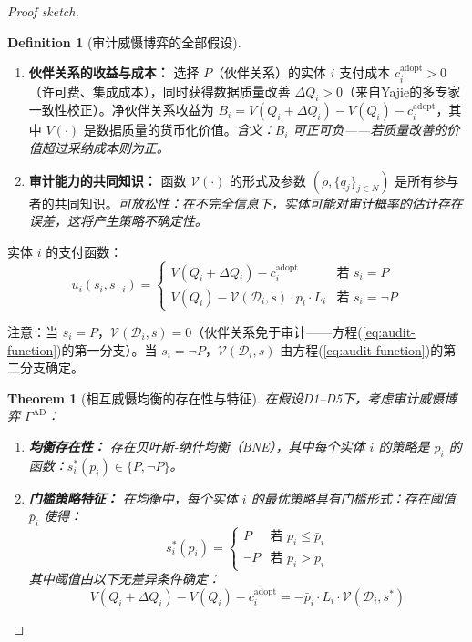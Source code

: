 \documentclass[12pt,a4paper]{ctexart}
\newtheorem{theorem}{Theorem}[section]
\theoremstyle{definition}
\newtheorem{definition}{Definition}[section]
\theoremstyle{remark}
\begin{document}
\begin{proof}[Proof sketch]
\begin{definition}[审计威慑博弈的全部假设]
\begin{enumerate}[label=\textbf{D\arabic*}, leftmargin=*, itemsep=4pt]
\item \textbf{伙伴关系的收益与成本：} 选择 $P$（伙伴关系）的实体 $i$ 支付成本 $c_i^{\text{adopt}} > 0$（许可费、集成成本），同时获得数据质量改善 $\Delta Q_i > 0$（来自Yajie的多专家一致性校正）。净伙伴关系收益为 $B_i = V(Q_i + \Delta Q_i) - V(Q_i) - c_i^{\text{adopt}}$，其中 $V(\cdot)$ 是数据质量的货币化价值。\hfill\textit{含义：$B_i$ 可正可负——若质量改善的价值超过采纳成本则为正。}

\item \textbf{审计能力的共同知识：} 函数 $\mathcal{V}(\cdot)$ 的形式及参数 $(\rho, \{q_j\}_{j \in N})$ 是所有参与者的共同知识。\hfill\textit{可放松性：在不完全信息下，实体可能对审计概率的估计存在误差，这将产生策略不确定性。}
\end{enumerate}
\end{definition}

实体 $i$ 的支付函数：
\begin{equation}
u_i(s_i, s_{-i}) =
\begin{cases}
V(Q_i + \Delta Q_i) - c_i^{\text{adopt}} & \text{若 } s_i = P \\
V(Q_i) - \mathcal{V}(\mathcal{D}_i, s) \cdot p_i \cdot L_i & \text{若 } s_i = \neg P
\end{cases}
\label{eq:ad-payoffs}
\end{equation}

注意：当 $s_i = P$，$\mathcal{V}(\mathcal{D}_i, s) = 0$（伙伴关系免于审计——方程(\ref{eq:audit-function})的第一分支）。当 $s_i = \neg P$，$\mathcal{V}(\mathcal{D}_i, s)$ 由方程(\ref{eq:audit-function})的第二分支确定。

\begin{theorem}[相互威慑均衡的存在性与特征]
\label{thm:mutual-deterrence}
在假设D1--D5下，考虑审计威慑博弈 $\Gamma^{\text{AD}}$：

\begin{enumerate}[label=(\roman*), itemsep=6pt]
\item \textbf{均衡存在性：} 存在贝叶斯-纳什均衡（BNE），其中每个实体 $i$ 的策略是 $p_i$ 的函数：$s_i^*(p_i) \in \{P, \neg P\}$。

\item \textbf{门槛策略特征：} 在均衡中，每个实体 $i$ 的最优策略具有门槛形式：存在阈值 $\bar{p}_i$ 使得：
\begin{equation}
s_i^*(p_i) =
\begin{cases}
P & \text{若 } p_i \leq \bar{p}_i \\
\neg P & \text{若 } p_i > \bar{p}_i
\end{cases}
\label{eq:threshold-strategy}
\end{equation}
其中阈值由以下无差异条件确定：
\begin{equation}
V(Q_i + \Delta Q_i) - V(Q_i) - c_i^{\text{adopt}} = -\bar{p}_i \cdot L_i \cdot \mathcal{V}(\mathcal{D}_i, s^*)
\label{eq:threshold-condition}
\end{equation}


\end{enumerate}
\end{theorem}
\end{proof}
\end{document}

